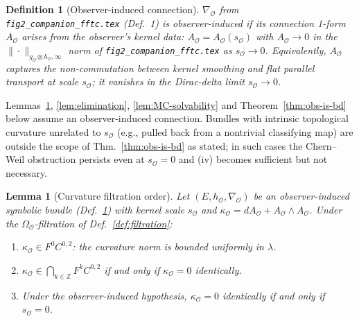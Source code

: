 \documentclass[11pt]{article}
\newtheorem{definition}{Definition}
\newtheorem{lemma}{Lemma}
\newcommand{\Obs}{\mathcal{O}}
\newcommand{\OmegaO}{\Omega_{\Obs}}
\newcommand{\kappaO}{\kappa_{\Obs}}
\newcommand{\AO}{A_{\Obs}}
\newcommand{\nablaO}{\nabla_{\Obs}}
\newcommand{\hO}{h_{\Obs}}
\newcommand{\gO}{g_{\Obs}}
\newcommand{\rmin}{s_{\Obs}}
\newcommand{\EE}{E}
\begin{document}
\begin{definition}[Observer-induced connection]
\label{def:obs-induced}
$\nablaO$ from \texttt{fig2\_companion\_fftc.tex} (Def.~1) is
\emph{observer-induced} if its connection 1-form $\AO$ arises
from the observer's kernel data: $\AO = \AO(\rmin)$ with $\AO \to 0$
in the $\|\cdot\|_{\gO \otimes \hO, \infty}$ norm of
\texttt{fig2\_companion\_fftc.tex} as $\rmin \to 0$. Equivalently,
$\AO$ captures the non-commutation between kernel smoothing and
flat parallel transport at scale $\rmin$; it vanishes in the
Dirac-delta limit $\rmin \to 0$.
\end{definition}

\noindent Lemmas~\ref{lem:kappa-filtration}, \ref{lem:elimination},
\ref{lem:MC-solvability} and Theorem~\ref{thm:obs-is-bd} below
assume an observer-induced connection. Bundles with intrinsic
topological curvature unrelated to $\rmin$ (e.g., pulled back from
a nontrivial classifying map) are outside the scope of
Thm.~\ref{thm:obs-is-bd} as stated; in such cases the Chern--Weil
obstruction persists even at $\rmin = 0$ and (iv) becomes
sufficient but not necessary.

\begin{lemma}[Curvature filtration order]
\label{lem:kappa-filtration}
Let $(\EE, \hO, \nablaO)$ be an observer-induced symbolic bundle
(Def.~\ref{def:obs-induced}) with kernel scale $\rmin$ and
$\kappaO = d\AO + \AO \wedge \AO$. Under the $\OmegaO$-filtration
of Def.~\ref{def:filtration}:
\begin{enumerate}[label=(\alph*),leftmargin=*,itemsep=2pt]
\item $\kappaO \in F^0 C^{0, 2}$: the curvature norm is bounded
uniformly in $\lambda$.
\item $\kappaO \in \bigcap_{k \in \mathbb{Z}} F^k C^{0, 2}$ if and
only if $\kappaO = 0$ identically.
\item Under the observer-induced hypothesis, $\kappaO = 0$
identically if and only if $\rmin = 0$.
\end{enumerate}
\end{lemma}
\end{document}

